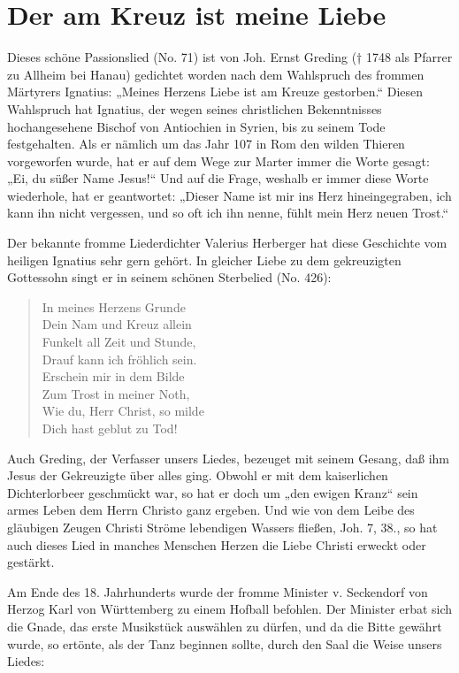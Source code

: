 \chapter[Der am Kreuz]{Der am Kreuz ist meine Liebe}

Dieses schöne Passionslied (No. 71) ist von Joh. Ernst Greding († 1748 als Pfarrer zu Allheim bei Hanau) gedichtet worden nach dem Wahlspruch des frommen Märtyrers Ignatius: „Meines Herzens Liebe ist am Kreuze gestorben.“ Diesen Wahlspruch hat Ignatius, der wegen seines christlichen Bekenntnisses hochangesehene Bischof von Antiochien in Syrien, bis zu seinem Tode festgehalten. Als er nämlich um das Jahr 107 in Rom den wilden Thieren vorgeworfen wurde, hat er auf dem Wege zur Marter immer die Worte gesagt: „Ei, du süßer Name Jesus!“ Und auf die Frage, weshalb er immer diese Worte wiederhole, hat er geantwortet: „Dieser Name ist mir ins Herz hineingegraben, ich kann ihn nicht vergessen, und so oft ich ihn nenne, fühlt mein Herz neuen Trost.“

Der bekannte fromme Liederdichter Valerius Herberger hat diese Geschichte vom heiligen Ignatius sehr gern gehört. In gleicher Liebe zu dem gekreuzigten Gottessohn singt er in seinem schönen Sterbelied (No. 426):

\begin{verse}
In meines Herzens Grunde\\
Dein Nam und Kreuz allein\\
Funkelt all Zeit und Stunde,\\
Drauf kann ich fröhlich sein.\\
Erschein mir in dem Bilde\\
Zum Trost in meiner Noth,\\
Wie du, Herr Christ, so milde\\
Dich hast geblut zu Tod!
\end{verse}

Auch Greding, der Verfasser unsers Liedes, bezeuget mit seinem Gesang, daß ihm Jesus der Gekreuzigte über alles ging. Obwohl er mit dem kaiserlichen Dichterlorbeer geschmückt war, so hat er doch um „den ewigen Kranz“ sein armes Leben dem Herrn Christo ganz ergeben. Und wie von dem Leibe des gläubigen Zeugen Christi Ströme lebendigen Wassers fließen, Joh. 7, 38., so hat auch dieses Lied in manches Menschen Herzen die Liebe Christi erweckt oder gestärkt.

Am Ende des 18. Jahrhunderts wurde der fromme Minister v. Seckendorf von Herzog Karl von Württemberg zu einem Hofball befohlen. Der Minister erbat sich die Gnade, das erste Musikstück auswählen zu dürfen, und da die Bitte gewährt wurde, so ertönte, als der Tanz beginnen sollte, durch den Saal die Weise unsers Liedes:


